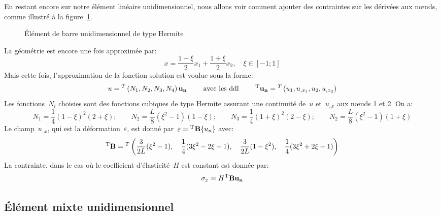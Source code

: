 En restant encore sur notre élément linéaire unidimensionnel, nous allons voir comment ajouter des contraintes sur les dérivées aux nœuds, comme illustré à la figure~\ref{fig-ex2Her}.
\begin{figure}[h!]\centering
{} \hspace{5em}
\caption{Élément de barre unidimensionnel de type Hermite}\label{fig-ex2Her}
\end{figure}
\medskipvm
La géométrie est encore une fois approximée par:
\begin{equation} x=\frac{1-\xi}2 x_1 + \frac{1+\xi}2 x_2, \quad \xi\in[-1;1] \end{equation}
\medskipvm
Mais cette fois, l'approximation de la fonction solution est voulue sous la forme:
\begin{equation}
u = \LLL{N_1, N_2, N_3, N_4}\VV{u_n} \qquad \text{ avec les ddl } \qquad
\LL{u_n}=\LLL{u_1, u_{,x_1}, u_2, u_{,x_2}} 
\end{equation}
\medskipvm
Les fonctions~$N_i$ choisies sont des fonctions cubiques de type Hermite assurant une continuité de~$u$ et~$u_{,x}$ aux nœuds 1 et 2. On a:
\begin{equation}
N_1=\frac14(1-\xi)^2(2+\xi); \qquad
N_2=\frac{L}8(\xi^2-1)(1-\xi); \qquad
N_3=\frac14(1+\xi)^2(2-\xi); \qquad
N_2=\frac{L}8(\xi^2-1)(1+\xi)
\end{equation}
\medskipvm
Le champ~$u_{,x}$, qui est la déformation~$\varepsilon$, est donné par~$\varepsilon={}^\mathrm{T}\mathbf{B}\{u_n\}$ avec:
\begin{equation} {}^\mathrm{T}\mathbf{B}={}^T\left( \frac3{2L}(\xi^2-1), \quad \frac14(3\xi^2-2\xi-1), \quad \frac3{2L}(1-\xi^2), \quad
\frac14(3\xi^2+2\xi-1)\right)\end{equation}
\medskipvm
La contrainte, dans le cas où le coefficient d'élasticité~$H$ est constant est donnée par:
\begin{equation}\sigma_x=H \LL{B}\VV{u_n}\end{equation}

\medskip
\subsection{Élément mixte unidimensionnel}

